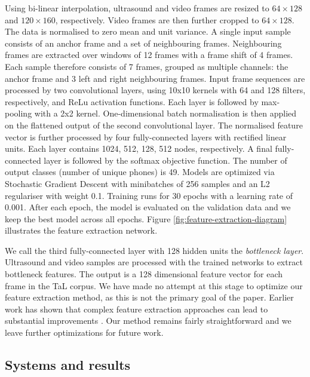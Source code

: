 \documentclass[a4paper]{article}
\begin{document}
Using bi-linear interpolation, ultrasound and video frames are resized to $64 \times 128$ and $120 \times 160$, respectively.
Video frames are then further cropped to $64 \times 128$.
The data is normalised to zero mean and unit variance.
A single input sample consists of an anchor frame and a set of neighbouring frames.
Neighbouring frames are extracted over windows of 12 frames with a frame shift of 4 frames.
Each sample therefore consists of 7 frames, grouped as multiple channels: the anchor frame and 3 left and right neighbouring frames.
Input frame sequences are processed by two convolutional layers, using 10x10 kernels with 64 and 128 filters, respectively, and ReLu activation functions.
Each layer is followed by max-pooling with a 2x2 kernel.
One-dimensional batch normalisation is then applied on the flattened output of the second convolutional layer.
The normalised feature vector is further processed by four fully-connected layers with rectified linear units. 
Each layer contains 1024, 512, 128, 512 nodes, respectively.
A final fully-connected layer is followed by the softmax objective function.
The number of output classes (number of unique phones) is 49.
Models are optimized via Stochastic Gradient Descent with minibatches of 256 samples and an L2 regulariser with weight 0.1.
Training runs for 30 epochs with a learning rate of 0.001.
After each epoch, the model is evaluated on the validation data and we keep the best model across all epochs.
Figure \ref{fig:feature-extraction-diagram} illustrates the feature extraction network.

We call the third fully-connected layer with 128 hidden units the \emph{bottleneck layer}.
Ultrasound and video samples are processed with the trained networks to extract bottleneck features.
The output is a 128 dimensional feature vector for each frame in the TaL corpus.
We have made no attempt at this stage to optimize our feature extraction method, as this is not the primary goal of the paper.
Earlier work has shown that complex feature extraction approaches can lead to substantial improvements \cite{tatulli2017feature, liu2016comparison}.
Our method remains fairly straightforward and we leave further optimizations for future work.


\subsection{Systems and results}
\end{document}
